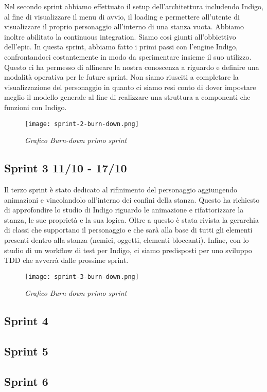 Nel secondo sprint abbiamo effettuato il setup dell'architettura includendo Indigo, al fine di visualizzare il menu di avvio, il loading e permettere all'utente di visualizzare il proprio personaggio all'interno di una stanza vuota. 
Abbiamo inoltre abilitato la continuous integration. Siamo così giunti all'obbiettivo dell'epic. In questa sprint, abbiamo fatto i primi passi con l'engine Indigo, confrontandoci costantemente in modo da sperimentare insieme il suo utilizzo. Questo ci ha permesso di allineare la nostra conoscenza a riguardo e definire una modalità operativa per le future sprint. 
Non siamo riusciti a completare la visualizzazione del personaggio in quanto ci siamo resi conto di dover impostare meglio il modello generale al fine di realizzare una struttura a componenti che funzioni con Indigo.

\begin{figure}[!hbt]
    \centering
    \texttt{[image: sprint-2-burn-down.png]}
    \caption{\textit{Grafico Burn-down primo sprint}} 
\end{figure}

\subsection{Sprint 3 11/10 - 17/10}

Il terzo sprint è stato dedicato al rifinimento del personaggio aggiungendo animazioni e vincolandolo all'interno dei confini della stanza. 
Questo ha richiesto di approfondire lo studio di Indigo riguardo le animazione e rifattorizzare la stanza, le sue proprietà e la sua logica. 
Oltre a questo è stata rivista la gerarchia di classi che supportano il personaggio e che sarà alla base di tutti gli elementi presenti dentro alla stanza (nemici, oggetti, elementi bloccanti).
Infine, con lo studio di un workflow di test per Indigo, ci siamo predisposti per uno sviluppo TDD che avverrà dalle prossime sprint.


\begin{figure}[!hbt]
    \centering
    \texttt{[image: sprint-3-burn-down.png]}
    \caption{\textit{Grafico Burn-down primo sprint}} 
\end{figure}


\subsection{Sprint 4}

\subsection{Sprint 5}

\subsection{Sprint 6}